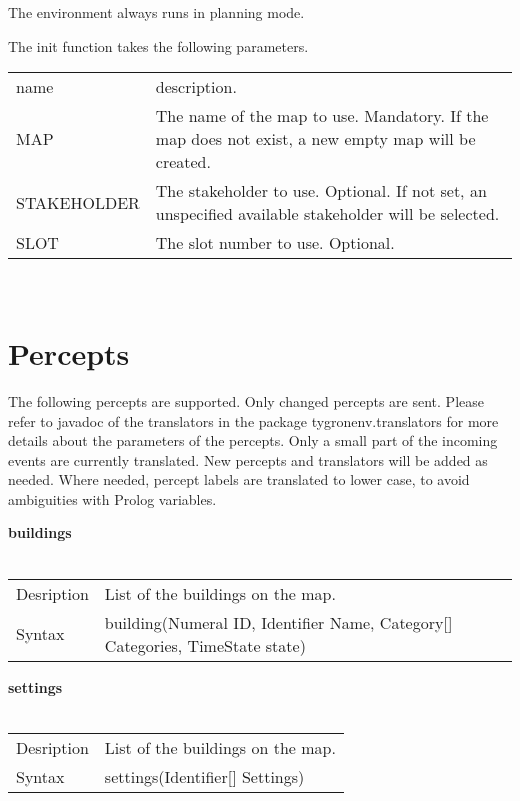 \documentclass[english,11pt]{article}
\begin{document}
The environment always runs in planning mode.

The init function takes the following parameters. 

\begin{tabularx}{\textwidth}{lX}
 name & description. \\
 MAP & The name of the map to use.  Mandatory. If the map does not exist, a new empty map will be created. \\
 STAKEHOLDER & The stakeholder to use. Optional. If not set, an unspecified available stakeholder will be selected. \\
 SLOT &  The slot number to use.  Optional.  \\
\end{tabularx}\\


\section{Percepts}

The following percepts are supported. Only changed percepts are sent. Please refer to javadoc of the translators in the package tygronenv.translators for more details about the parameters of the percepts. Only a small part of the incoming events are currently translated. New percepts and translators will be added as needed. Where needed, percept labels are translated to lower case, to avoid ambiguities with Prolog variables.
\newline


\textbf{buildings}\\
\\
\begin{tabularx}{\textwidth}{lX}
 Desription & List of the buildings on the map. \\
 Syntax & building(Numeral ID, Identifier Name, Category[] Categories, TimeState state) \\
\end{tabularx}
\newline

\textbf{settings}\\
\\
\begin{tabularx}{\textwidth}{lX}
 Desription & List of the buildings on the map. \\
 Syntax & settings(Identifier[] Settings) \\
\end{tabularx}
\newline
\end{document}

